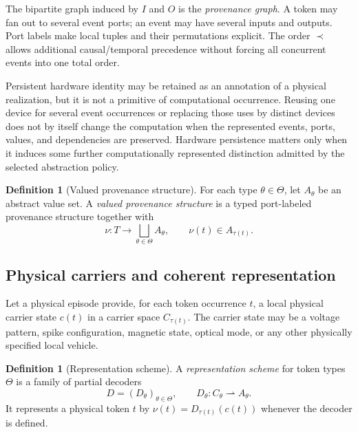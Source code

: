 \documentclass[11pt,a4paper]{article}
\theoremstyle{clean}
\theoremstyle{definition}
\newtheorem{definition}[theorem]{Definition}
\begin{document}
The bipartite graph induced by $I$ and $O$ is the \emph{provenance graph}. A token may fan out to several event ports; an event may have several inputs and outputs. Port labels make local tuples and their permutations explicit. The order $\prec$ allows additional causal/temporal precedence without forcing all concurrent events into one total order.

Persistent hardware identity may be retained as an annotation of a physical realization, but it is not a primitive of computational occurrence. Reusing one device for several event occurrences or replacing those uses by distinct devices does not by itself change the computation when the represented events, ports, values, and dependencies are preserved. Hardware persistence matters only when it induces some further computationally represented distinction admitted by the selected abstraction policy.

\begin{definition}[Valued provenance structure]
For each type $\theta\in\Theta$, let $A_\theta$ be an abstract value set. A \emph{valued provenance structure} is a typed port-labeled provenance structure together with
\[
\nu:T\to \bigsqcup_{\theta\in\Theta} A_\theta,
\qquad \nu(t)\in A_{\tau(t)}.
\]
\end{definition}

\subsection{Physical carriers and coherent representation}

Let a physical episode provide, for each token occurrence $t$, a local physical carrier state $c(t)$ in a carrier space $C_{\tau(t)}$. The carrier state may be a voltage pattern, spike configuration, magnetic state, optical mode, or any other physically specified local vehicle.

\begin{definition}[Representation scheme]
A \emph{representation scheme} for token types $\Theta$ is a family of partial decoders
\[
D=(D_\theta)_{\theta\in\Theta},\qquad D_\theta:C_\theta\rightharpoonup A_\theta.
\]
It represents a physical token $t$ by $\nu(t)=D_{\tau(t)}(c(t))$ whenever the decoder is defined.
\end{definition}
\end{document}
